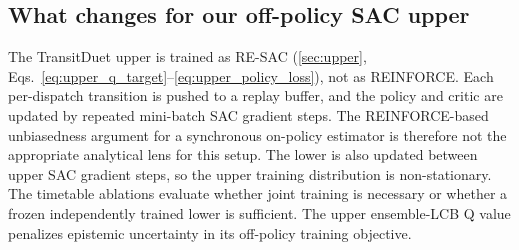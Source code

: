 \subsection{What changes for our off-policy SAC upper}
The TransitDuet upper is trained as RE-SAC (\cref{sec:upper}, Eqs.~\ref{eq:upper_q_target}--\ref{eq:upper_policy_loss}), not as REINFORCE. Each per-dispatch transition is pushed to a replay buffer, and the policy and critic are updated by repeated mini-batch SAC gradient steps. The REINFORCE-based unbiasedness argument for a synchronous on-policy estimator is therefore not the appropriate analytical lens for this setup. The lower is also updated between upper SAC gradient steps, so the upper training distribution is non-stationary. The timetable ablations evaluate whether joint training is necessary or whether a frozen independently trained lower is sufficient. The upper ensemble-LCB Q value penalizes epistemic uncertainty in its off-policy training objective.
